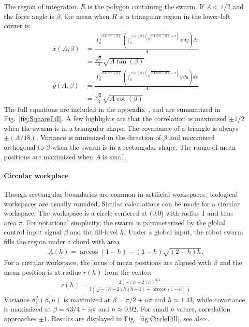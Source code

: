 The region of integration $R$ is the polygon containing the swarm. If $A<1/2$ and the force angle is $\beta$, the mean when $R$ is a triangular region in the lower-left corner is:
\begin{align}\label{eq:meanInSquareWorkspaceLL}
\bar{x}(A,\beta) &= \frac{\int_0^{\sqrt{2 A \tan (\beta)}} \left(\int_0^{\cot (\beta) \left(\sqrt{2 A \tan (\beta)}-x\right)} x \, dy\right) \, dx}{A} \nonumber \\
	&=\frac{ \sqrt{2}}{3} \sqrt{A \tan (\beta )}\\
\bar{y}(A,\beta) &= \frac{\int_0^{\sqrt{2 A \tan (\beta)}} \left(\int_0^{\cot (\beta) \left(\sqrt{2 A \tan (\beta)}-x\right)} y \, dy\right) \, dx}{A} \nonumber\\
	&=\frac{\sqrt{2}}{3}  \sqrt{A \cot (\beta )}
\end{align}
The full equations are included in the appendix~\citep{2016arXiv160901830S}, and are summarized in Fig.~\ref{fig:SquareFill}. A few highlights are that the correlation is maximized $\pm$1/2 when the swarm is in a triangular shape. The covariance of a triangle is always $\pm(A/18)$. Variance is minimized in the direction of $\beta$ and maximized orthogonal to $\beta$ when the swarm is in a rectangular shape. The range of mean positions are maximized when $A$ is small.

\paragraph{Circular workplace}
Though rectangular boundaries are common in artificial workspaces, biological workspaces are usually rounded.
Similar calculations can be made for a circular workspace.  The workspace is a circle centered at (0,0) with radius 1 and thus area $\pi$.
For notational simplicity, the swarm is parameterized by the global control input signal $\beta$ and the fill-level $h$.  
Under a global input, the robot swarm fills the region under a chord with area
\begin{align}
A(h) = \arccos(1-h)-(1-h) \sqrt{(2-h) h}.
\end{align}
For a circular workspace, the locus of mean positions are aligned with $\beta$ and the mean position is at radius $r(h)$ from the center:
\begin{align}
r(h) = \frac{2 (-(h-2) h)^{3/2}}{3 \left(\sqrt{-(h-2) h} (h-1)+\arccos(1-h)\right)}
\end{align}
Variance $\sigma^2_x(\beta,h)$ is maximized at $\beta = \pi/2+n \pi$ and $h\approx1.43$, while covariance is maximized at $\beta = \pi3/4+n \pi$ and $h\approx0.92.$ For small $h$ values, correlation approaches $\pm1$. Results are displayed in Fig.~\ref{fig:CircleFill}, see also \citep{Zhao2016mathematica}.

